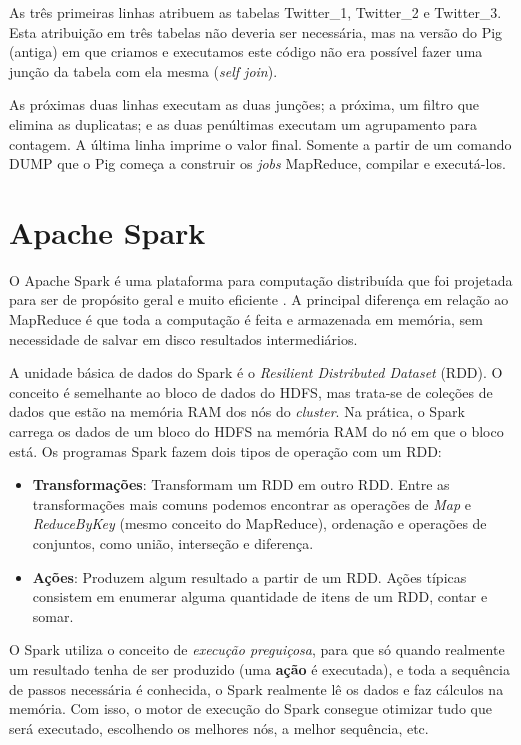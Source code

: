 As três primeiras linhas atribuem as tabelas Twitter\_1, Twitter\_2 e Twitter\_3. Esta atribuição 
em três tabelas não deveria ser necessária, mas na versão do Pig (antiga) em que criamos e executamos
este código não era possível fazer uma junção da tabela com ela mesma (\emph{self join}).

As próximas duas linhas executam as duas junções; a próxima, um filtro que elimina as duplicatas;
e as duas penúltimas executam um agrupamento para contagem. A última linha imprime o valor final.
Somente a partir de um comando DUMP que o Pig começa a construir os \textit{jobs} MapReduce, compilar
e executá-los.

\section{Apache Spark}

O Apache Spark é uma plataforma para computação distribuída que foi projetada para ser de propósito 
geral e muito eficiente \citep{zaharia2012resilient, karau2015learning}. A principal diferença em 
relação ao MapReduce é que toda a computação é feita e armazenada em memória, sem necessidade de salvar 
em disco resultados intermediários. 

A unidade básica de dados do Spark é o \textit{Resilient Distributed Dataset} (RDD). O conceito é 
semelhante ao bloco de dados do HDFS, mas trata-se de coleções de dados que estão na memória RAM dos 
nós do \textit{cluster}. Na prática, o Spark carrega os dados de um bloco do HDFS na memória RAM do nó 
em que o bloco está. Os programas Spark fazem dois tipos de operação com um RDD:

\begin{itemize}
	\item \textbf{Transformações}: Transformam um RDD em outro RDD. Entre as transformações mais 
comuns podemos encontrar as operações de \textit{Map} e \textit{ReduceByKey} (mesmo conceito do MapReduce), 
ordenação e operações de conjuntos, como união, interseção e diferença.
	\item \textbf{Ações}: Produzem algum resultado a partir de um RDD. Ações típicas consistem em 
enumerar alguma quantidade de itens de um RDD, contar e somar. 
\end{itemize}

O Spark utiliza o conceito de \emph{execução preguiçosa}, para que só quando realmente um resultado 
tenha de ser produzido (uma \textbf{ação} é executada), e toda a sequência de passos necessária é 
conhecida, o Spark realmente lê os dados e faz cálculos na memória. Com isso, o motor de execução do 
Spark consegue otimizar tudo que será executado, escolhendo os melhores nós, a melhor sequência, etc.

